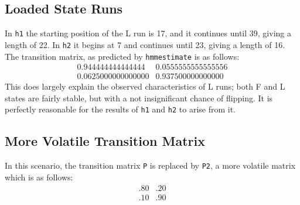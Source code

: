 \documentclass[titlepage]{scrartcl}
\begin{document}
\subsection{Loaded State Runs}
In \verb|h1| the starting position of the L run is 17, and it continues until 39, giving a length of 22.  In \verb|h2| it begins at 7 and continues until 23, giving a length of 16.  The transition matrix, as predicted by \verb|hmmestimate| is as follows:
\[\begin{array}{cc}
	0.944444444444444 & 0.0555555555555556 \\
	0.0625000000000000 & 0.937500000000000
\end{array}\]
This does largely explain the observed characteristics of L runs; both F and L states are fairly stable, but with a not insignificant chance of flipping.  It is perfectly reasonable for the results of \verb|h1| and \verb|h2| to arise from it.
\subsection{More Volatile Transition Matrix}
In this scenario, the transition matrix \verb|P| is replaced by \verb|P2|, a more volatile matrix which is as follows:
\[
\begin{array}{cc}
	.80 & .20 \\
	.10 & .90
\end{array}
\]
\end{document}
